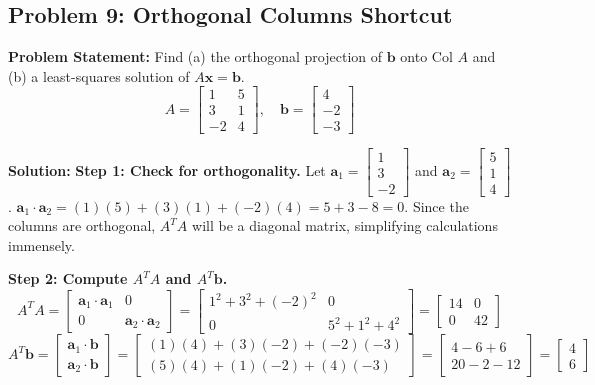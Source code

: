 \documentclass[11pt, letterpaper]{article}
\theoremstyle{definition}
\theoremstyle{remark}
\begin{document}
\vspace{1em}
\subsection{Problem 9: Orthogonal Columns Shortcut}
\textbf{Problem Statement:} Find (a) the orthogonal projection of $\mathbf{b}$ onto $\text{Col } A$ and (b) a least-squares solution of $A\mathbf{x} = \mathbf{b}$.
\[ A = \begin{bmatrix} 1 & 5 \\ 3 & 1 \\ -2 & 4 \end{bmatrix}, \quad \mathbf{b} = \begin{bmatrix} 4 \\ -2 \\ -3 \end{bmatrix} \]

\textbf{Solution:}
\textbf{Step 1: Check for orthogonality.}
Let $\mathbf{a}_1 = \begin{bmatrix} 1 \\ 3 \\ -2 \end{bmatrix}$ and $\mathbf{a}_2 = \begin{bmatrix} 5 \\ 1 \\ 4 \end{bmatrix}$.
$\mathbf{a}_1 \cdot \mathbf{a}_2 = (1)(5) + (3)(1) + (-2)(4) = 5 + 3 - 8 = 0$.
Since the columns are orthogonal, $A^T A$ will be a diagonal matrix, simplifying calculations immensely.

\textbf{Step 2: Compute $A^T A$ and $A^T \mathbf{b}$.}
\[
A^T A = \begin{bmatrix} \mathbf{a}_1 \cdot \mathbf{a}_1 & 0 \\ 0 & \mathbf{a}_2 \cdot \mathbf{a}_2 \end{bmatrix} = \begin{bmatrix} 1^2 + 3^2 + (-2)^2 & 0 \\ 0 & 5^2 + 1^2 + 4^2 \end{bmatrix} = \begin{bmatrix} 14 & 0 \\ 0 & 42 \end{bmatrix}
\]
\[
A^T \mathbf{b} = \begin{bmatrix} \mathbf{a}_1 \cdot \mathbf{b} \\ \mathbf{a}_2 \cdot \mathbf{b} \end{bmatrix} = \begin{bmatrix} (1)(4) + (3)(-2) + (-2)(-3) \\ (5)(4) + (1)(-2) + (4)(-3) \end{bmatrix} = \begin{bmatrix} 4 - 6 + 6 \\ 20 - 2 - 12 \end{bmatrix} = \begin{bmatrix} 4 \\ 6 \end{bmatrix}
\]
\end{document}
